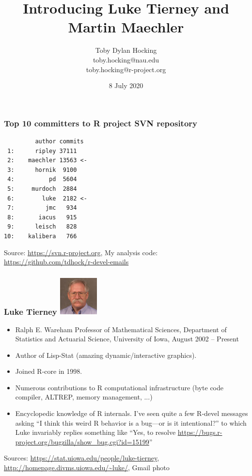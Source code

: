 \documentclass{beamer}
\begin{document}
\title{Introducing Luke Tierney and Martin Maechler}

\author{
  Toby Dylan Hocking\\
  toby.hocking@nau.edu\\
  toby.hocking@r-project.org\\
}

\date{8 July 2020}

\maketitle

\begin{frame}[fragile]
  \frametitle{Top 10 committers to R project SVN repository}

  \begin{verbatim}
         author commits
 1:      ripley 37111
 2:    maechler 13563 <-
 3:      hornik  9100
 4:          pd  5604
 5:     murdoch  2884
 6:        luke  2182 <-
 7:         jmc   934
 8:       iacus   915
 9:      leisch   828
10:    kalibera   766
\end{verbatim}

  Source: \url{https://svn.r-project.org}, My analysis code:
  \url{https://github.com/tdhock/r-devel-emails}
  
\end{frame}

\begin{frame}
  \frametitle{Luke Tierney \includegraphics[height=2cm]{photo_luke}}

  \begin{itemize}
  \item Ralph E. Wareham Professor of Mathematical Sciences,
    Department of Statistics and Actuarial Science, University of
    Iowa, August 2002 -- Present
  \item Author of Lisp-Stat (amazing dynamic/interactive graphics).
  \item Joined R-core in 1998.
  \item Numerous contributions to R computational
    infrastructure (byte code compiler, ALTREP, memory management, ...)
  \item Encyclopedic knowledge of R internals. I've seen quite a few
    R-devel messages asking ``I think this weird R behavior is a
    bug---or is it intentional?'' to which Luke invariably replies
    something like ``Yes, to resolve
    \url{https://bugs.r-project.org/bugzilla/show_bug.cgi?id=15199}''
  \end{itemize}

  Sources: \url{https://stat.uiowa.edu/people/luke-tierney},
  \url{http://homepage.divms.uiowa.edu/~luke/}, Gmail photo
  
\end{frame}
\end{document}
